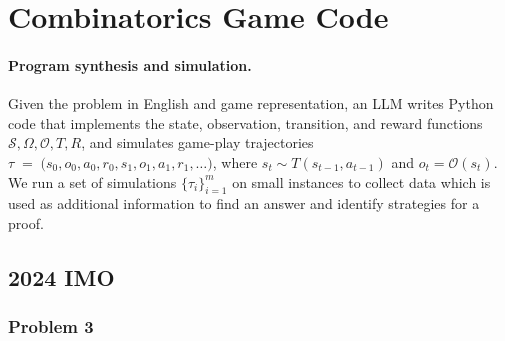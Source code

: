 \UseRawInputEncoding

\section{Combinatorics Game Code}
\label{appendix:H}

\paragraph{Program synthesis and simulation.}
Given the problem in English and game representation, an LLM writes Python code that implements the state, observation, transition, and reward functions $\mathcal{S}, \Omega, \mathcal{O}, T, R$, and simulates game-play trajectories $\tau \;=\; \bigl(s_0, o_0, a_0, r_0, s_1, o_1, a_1, r_1,\ldots\bigr)$, where $s_t \sim T(s_{t-1}, a_{t-1})$ and $o_t = \mathcal{O}(s_t)$. We run a set of simulations $\{\tau_i\}_{i=1}^m$ on small instances to collect data which is used as additional information to find an answer and identify strategies for a proof.


\subsection*{2024 IMO}
\label{appendix:H_2024_IMO}


\subsubsection*{Problem 3}

